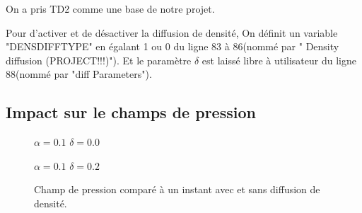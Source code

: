 \documentclass{article}
\begin{document}
On a pris TD2 comme une base de notre projet. 

Pour d'activer et de désactiver la diffusion de densité, On définit un variable "DENSDIFFTYPE" en égalant 1 ou 0 du ligne 83 à 86(nommé par " Density diffusion (PROJECT!!!)"). Et le paramètre $\delta$ est laissé libre à utilisateur du ligne 88(nommé par "diff Parameters").\par
  
\subsection{Impact sur le champs de pression}
\begin{figure}[h]
	\begin{minipage}[h]{0.49\linewidth}
		{$\alpha=0.1$ $\delta=0.0$}
	\end{minipage}
	\hfill
	\begin{minipage}[h]{0.49\linewidth}
		{$\alpha=0.1$ $\delta=0.2$}
	\end{minipage}
	\caption{Champ de pression comparé à un instant avec et sans diffusion de densité.}
\end{figure}
\end{document}
